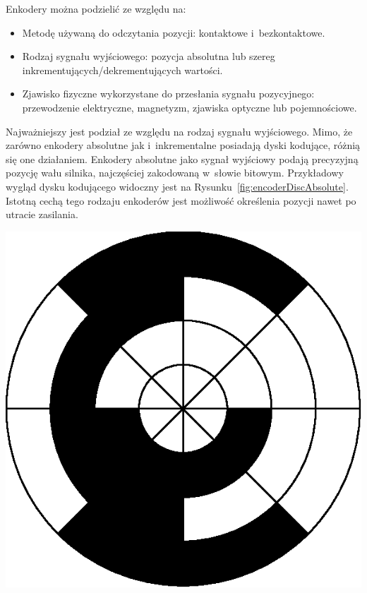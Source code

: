 Enkodery można podzielić ze względu na\cite{bib:rodzajeenkoderow}:
\begin{itemize}
    \item Metodę używaną do odczytania pozycji: kontaktowe i~bezkontaktowe.
    \item Rodzaj sygnału wyjściowego: pozycja absolutna lub szereg inkrementujących/dekrementujących wartości.
    \item Zjawisko fizyczne wykorzystane do przesłania sygnału pozycyjnego: przewodzenie elektryczne, magnetyzm, zjawiska optyczne lub pojemnościowe.
\end{itemize}

Najważniejszy jest podział ze względu na rodzaj sygnału wyjściowego. Mimo, że zarówno enkodery absolutne jak i~inkrementalne posiadają dyski kodujące, różnią się one działaniem. Enkodery absolutne jako sygnał wyjściowy podają precyzyjną pozycję wału silnika, najczęściej zakodowaną w~słowie bitowym. Przykładowy wygląd dysku kodującego widoczny jest na Rysunku~\ref{fig:encoderDiscAbsolute}. Istotną cechą tego rodzaju enkoderów jest możliwość określenia pozycji nawet po utracie zasilania.

\begin{center}
\includegraphics[scale=1]{images/encoderDiscAbsolute.eps}
\label{fig:encoderDiscAbsolute}
\end{center}

